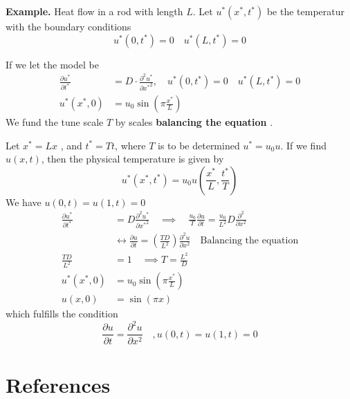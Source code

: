 \documentclass{article}
\theoremstyle{remark}
\begin{document}
\begin{tcolorbox}
  \textbf{Example.} Heat flow in a rod with length $L$. Let $u^{*} \left( x^{*}, t^{*} \right)$ be the temperatur with the boundary conditions \[
  u^{*}\left( 0, t^{*} \right) = 0 \quad  u^{*}\left( L, t^{*} \right) = 0 
  \] 

  If we let the model be \[
    \begin{split}
    \frac{\partial u^{*}}{\partial t^{*}}   & = D \cdot  \frac{\partial ^2 u^{*}}{\partial {x^{*} }^2},  \quad   u^{*}\left( 0, t^{*} \right) = 0 \quad  u^{*}\left( L, t^{*} \right) = 0 \\
 u^{*}\left( x^{*}, 0 \right)   & = u_{0} \sin \left( \pi  \frac{x^{*}}{ L}  \right) 
    \end{split} 
  \] 
  We fund the tune scale $T$ by scales \textbf{balancing the equation} . 
  \par Let $x^{*} = Lx$ , and $t^{*} = Tt$, where $T$ is to be determined $u^{*} = u_{0} u$. If we find $u\left( x,t \right) $,  then the physical temperature is given by \[
    u^{*}\left( x^{*} , t^{*} \right) = u_{0} u\left( \frac{x^{*}}{L} , \frac{t^{*}}{T}  \right)
  \]  
  We have $u\left( 0,t \right) = u\left( 1,t \right) = 0$ \[
    \begin{split}
  \frac{\partial u^{*}}{\partial t^{*}}   & = D \frac{\partial ^2 u^{*}}{\partial {x^{*}}^2}  \quad  \implies  \quad  \frac{u_{0}}{T}  \frac{\partial u}{\partial t}  = \frac{u_{0}}{L^2} D \frac{\partial ^2}{\partial x^2}    \\
    & \leftrightarrow  \frac{\partial u}{\partial  t}   = \left( \frac{T D}{L^2}  \right) \frac{\partial ^2 u}{\partial x ^2}  \quad  \text{Balancing the equation}   \\
      \frac{TD}{ L^2}    & = 1 \quad \implies  T = \frac{L^2}{D}   \\
     u^{*}\left( x^{*}, 0 \right) &=  u_{0} \sin \left( \pi \frac{x^{*}}{L}  \right)  \\
     u\left( x, 0 \right) &=  \sin \left( \pi x \right) 
    \end{split} 
  \] 
  which fulfills the condition \[
  \frac{\partial u}{\partial t}  = \frac{\partial ^2 u}{\partial  x^2}  \quad  , u\left( 0,t \right) = u\left( 1,t \right) = 0 
  \] 
\end{tcolorbox}



\newpage
\section{References}%
\label{sec:references}


  


\end{document}
